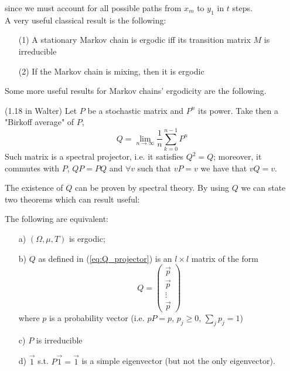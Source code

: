 since we must account for all possible paths from $x_m$ to $y_1$ in $t$ steps. 
\\A very useful classical result is the following:
\begin{theorem}
\hfill
    \begin{itemize}
        \item[(1)] A stationary Markov chain is ergodic iff its transition matrix $M$ is irreducible
        \item[(2)] If the Markov chain is mixing, then it is ergodic
    \end{itemize}
\end{theorem}
Some more useful results for Markov chains' ergodicity are the following. 
\begin{lemma}{(1.18 in Walter)}
    Let $P$ be a stochastic matrix and $P^n$ its power. Take then a "Birkoff average" of $P$, 
    \begin{equation}
    \label{eq:Q_projector}
        Q = \lim_{n \rightarrow \infty} \frac{1}{n} \sum_{k=0}^{n-1} P^n
    \end{equation}
    Such matrix is a spectral projector, i.e. it satisfies $Q^2 = Q$; moreover, it commutes with $P$, $QP = PQ$ and $\forall v$ such that $vP = v$ we have that $vQ = v$.
\end{lemma}
The existence of $Q$ can be proven by spectral theory. By using $Q$ we can state two theorems which can result useful:
\begin{theorem}
    The following are equivalent:
    \begin{itemize}
        \item[a)] $(\Omega, \mu, T)$ is ergodic;
        \item[b)] $Q$ as defined in (\ref{eq:Q_projector}) is an $l \times l$ matrix of the form 
        \begin{equation*}
            Q = 
            \begin{pmatrix}
                \Vec{p} \\
                \Vec{p} \\
                \vdots \\
                \Vec{p} 
            \end{pmatrix}
        \end{equation*}
        where $p$ is a probability vector (i.e. $pP = p$, $p_j \geq 0$, $\sum_j p_j = 1$)
        \item[c)] $P$ is irreducible
        \item[d)] $\Vec{1}$ s.t. $P \Vec{1} = \Vec{1}$ is a simple eigenvector (but not the only eigenvector).
    \end{itemize}
\end{theorem}
